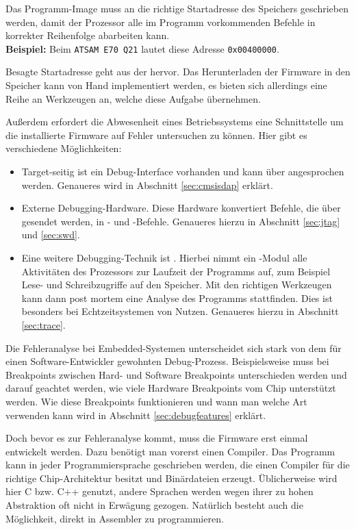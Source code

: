     Das Programm-Image muss an die richtige Startadresse des Speichers geschrieben werden, damit
    der Prozessor alle im Programm vorkommenden Befehle in korrekter Reihenfolge abarbeiten kann.
    \\\textbf{Beispiel:} Beim \texttt{ATSAM E70 Q21} lautet diese Adresse \texttt{0x00400000}.

    Besagte Startadresse geht aus der  hervor. Das Herunterladen der
    Firmware in den Speicher kann von Hand implementiert werden, es bieten sich allerdings eine Reihe an Werkzeugen an,
    welche diese Aufgabe übernehmen.

    Außerdem erfordert die Abwesenheit eines Betriebssystems eine Schnittstelle um die installierte Firmware
    auf Fehler untersuchen zu können. Hier gibt es verschiedene Möglichkeiten:
    \begin{itemize}
        \item Target-seitig ist ein Debug-Interface vorhanden und kann über  angesprochen werden. Genaueres wird in
        Abschnitt \ref{sec:cmsisdap} erklärt.
        \item Externe Debugging-Hardware. Diese Hardware konvertiert Befehle, die über  gesendet werden,
        in - und -Befehle. Genaueres hierzu in Abschnitt \ref{sec:jtag} und \ref{sec:swd}.
        \item Eine weitere Debugging-Technik ist . Hierbei nimmt ein -Modul alle Aktivitäten
        des Prozessors zur Laufzeit der Programms auf, zum Beispiel Lese- und Schreibzugriffe auf den Speicher. Mit den richtigen
        Werkzeugen kann dann post mortem eine Analyse des Programms stattfinden. Dies ist besonders bei
        Echtzeitsystemen von Nutzen\citep[vgl.~S.~3]{Campbell2014}. Genaueres hierzu in Abschnitt \ref{sec:trace}.
    \end{itemize}

    Die Fehleranalyse bei Embedded-Systemen unterscheidet sich stark von dem für einen Software-Entwickler gewohnten
    Debug-Prozess. Beispielsweise muss bei Breakpoints zwischen Hard- und Software Breakpoints unterschieden werden und
    darauf geachtet werden, wie viele Hardware Breakpoints vom Chip unterstützt werden. Wie diese Breakpoints
    funktionieren und wann man welche Art verwenden kann wird in Abschnitt \ref{sec:debugfeatures} erklärt.

    Doch bevor es zur Fehleranalyse kommt, muss die Firmware erst einmal entwickelt werden. Dazu benötigt man vorerst einen
    Compiler. Das Programm kann in jeder Programmiersprache geschrieben werden, die einen Compiler für die richtige
    Chip-Architektur besitzt und Binärdateien erzeugt. Üblicherweise wird hier C bzw. C++ genutzt, andere Sprachen werden
    wegen ihrer zu hohen Abstraktion oft nicht in Erwägung gezogen. Natürlich besteht auch die Möglichkeit, direkt
    in Assembler zu programmieren.

